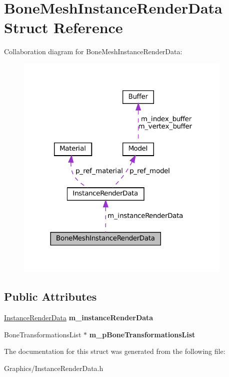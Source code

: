 \hypertarget{structBoneMeshInstanceRenderData}{}\section{Bone\+Mesh\+Instance\+Render\+Data Struct Reference}
\label{structBoneMeshInstanceRenderData}


Collaboration diagram for Bone\+Mesh\+Instance\+Render\+Data\+:\nopagebreak
\begin{figure}[H]
\begin{center}
\leavevmode
\includegraphics[width=293pt]{structBoneMeshInstanceRenderData__coll__graph}
\end{center}
\end{figure}
\subsection*{Public Attributes}
\begin{DoxyCompactItemize}
\item 
\mbox{\label{structBoneMeshInstanceRenderData_aece2eb77387fb00b70aa51bd97fa5f6b}} 
\hyperlink{structInstanceRenderData}{Instance\+Render\+Data} {\bfseries m\+\_\+instance\+Render\+Data}
\item 
\mbox{\label{structBoneMeshInstanceRenderData_abf865b22020ad64a00f2fb32028c3262}} 
Bone\+Transformations\+List $\ast$ {\bfseries m\+\_\+p\+Bone\+Transformations\+List}
\end{DoxyCompactItemize}


The documentation for this struct was generated from the following file\+:\begin{DoxyCompactItemize}
\item 
Graphics/Instance\+Render\+Data.\+h\end{DoxyCompactItemize}
